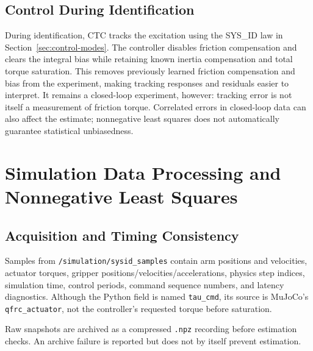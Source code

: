 \documentclass[11pt,a4paper]{report}
\begin{document}
\subsection{Control During Identification}
During identification, CTC tracks the excitation using the SYS\_ID law in
Section~\ref{sec:control-modes}.
The controller disables friction compensation and clears the integral bias while retaining known inertia compensation and total torque saturation. This removes previously learned friction compensation and bias from the experiment, making tracking responses and residuals easier to interpret. It remains a closed-loop experiment, however: tracking error is not itself a measurement of friction torque. Correlated errors in closed-loop data can also affect the estimate; nonnegative least squares does not automatically guarantee statistical unbiasedness.

\section{Simulation Data Processing and Nonnegative Least Squares}
\subsection{Acquisition and Timing Consistency}
Samples from \texttt{/simulation/sysid\_samples} contain arm positions and velocities, actuator torques, gripper positions/velocities/accelerations, physics step indices, simulation time, control periods, command sequence numbers, and latency diagnostics. Although the Python field is named \texttt{tau\_cmd}, its source is MuJoCo's \texttt{qfrc\_actuator}, not the controller's requested torque before saturation.

Raw snapshots are archived as a compressed \texttt{.npz} recording before estimation checks. An archive failure is reported but does not by itself prevent estimation.
\end{document}
